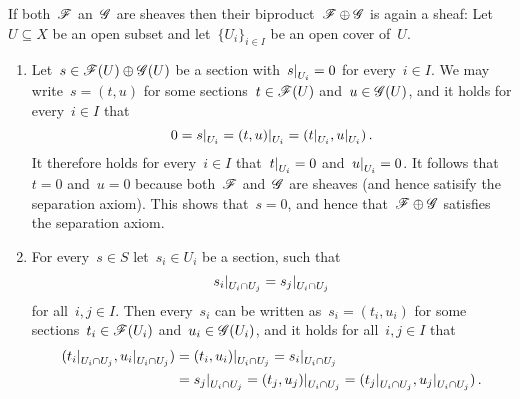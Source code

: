 \begin{example}
\begin{enumerate}
\begin{description}[font=\bfseries]
          If both~$\mathscr{F}$ an~$\mathscr{G}$ are sheaves then their biproduct~$\mathscr{F} \oplus \mathscr{G}$ is again a sheaf:
          Let~$U \subseteq X$ be an open subset and let~$\{ U_i \}_{i \in I}$ be an open cover of~$U$.
          \begin{enumerate}[label=(S\arabic*)]
            \item
              Let~$s \in \mathscr{F}(U) \oplus \mathscr{G}(U)$ be a section with~$\restrict{s}{U_i} = 0$ for every~$i \in I$.
              We may write~$s = (t,u)$ for some sections~$t \in \mathscr{F}(U)$ and~$u \in \mathscr{G}(U)$, and it holds for every~$i \in I$ that
              \[
                  0
                = \restrict{s}{U_i}
                = \restrict{(t,u)}{U_i}
                = ( \restrict{t}{U_i}, \restrict{u}{U_i} ) \,.
              \]
              It therefore holds for every~$i \in I$ that~$\restrict{t}{U_i} = 0$ and~$\restrict{u}{U_i} = 0$.
              It follows that~$t = 0$ and~$u = 0$ because both~$\mathscr{F}$ and~$\mathscr{G}$ are sheaves (and hence satisify the separation axiom).
              This shows that~$s = 0$, and hence that~$\mathscr{F} \oplus \mathscr{G}$ satisfies the separation axiom.
            \item
              For every~$s \in S$ let~$s_i \in U_i$ be a section, such that
              \[
                  \restrict{s_i}{U_i \cap U_j}
                = \restrict{s_j}{U_i \cap U_j}
              \]
              for all~$i,j \in I$.
              Then every~$s_i$ can be written as~$s_i = (t_i, u_i)$ for some sections~$t_i \in \mathscr{F}(U_i)$ and~$u_i \in \mathscr{G}(U_i)$, and it holds for all~$i, j \in I$ that
              \begin{align*}
                    (\restrict{t_i}{U_i \cap U_j}, \restrict{u_i}{U_i \cap U_j})
                &=  \restrict{(t_i, u_i)}{U_i \cap U_j}
                 =  \restrict{s_i}{U_i \cap U_j}  \\
                &=  \restrict{s_j}{U_i \cap U_j}
                 =  \restrict{(t_j, u_j)}{U_i \cap U_j}
                 =  (\restrict{t_j}{U_i \cap U_j}, \restrict{u_j}{U_i \cap U_j}) \,.
              \end{align*}

\end{enumerate}
\end{description}
\end{enumerate}
\end{example}
